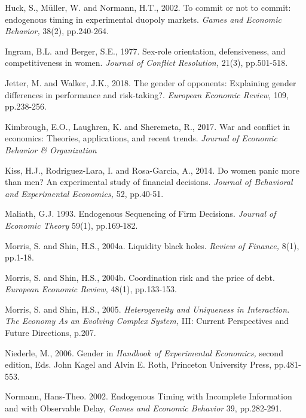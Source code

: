 \documentclass[12pt,english]{article}
\begin{document}
\begin{thebibliography}{10}
\bibitem{}Huck, S., M\"{u}ller, W. and Normann, H.T., 2002. To commit or not to commit: endogenous timing in experimental duopoly markets. \textit{Games and Economic Behavior,} 38(2), pp.240-264.

\bibitem{} Ingram, B.L. and Berger, S.E., 1977. Sex-role orientation, defensiveness, and competitiveness in women. \textit{Journal of Conflict Resolution,} 21(3), pp.501-518.

\bibitem{}Jetter, M. and Walker, J.K., 2018. The gender of opponents: Explaining gender differences in performance and risk-taking?. \textit{European Economic Review,} 109, pp.238-256.


\bibitem{} Kimbrough, E.O., Laughren, K. and Sheremeta, R., 2017. War and conflict in economics: Theories, applications, and recent trends. \textit{Journal of Economic Behavior \& Organization}

\bibitem{} Kiss, H.J., Rodriguez-Lara, I. and Rosa-Garcia, A., 2014. Do women panic more than men? An experimental study of financial decisions. \textit{Journal of Behavioral and Experimental Economics,} 52, pp.40-51.



\bibitem{} Maliath, G.J. 1993. Endogenous Sequencing of Firm Decisions. \textit{Journal of Economic Theory} 59(1), pp.169-182. 

\bibitem{} Morris, S. and Shin, H.S., 2004a. Liquidity black holes. \textit{Review of Finance,} 8(1), pp.1-18.

\bibitem{}  Morris, S. and Shin, H.S., 2004b. Coordination risk and the price of debt. \textit{European Economic Review,} 48(1), pp.133-153.

\bibitem{} Morris, S. and Shin, H.S., 2005. \textit{Heterogeneity and Uniqueness in Interaction. The Economy As an Evolving Complex System,} III: Current Perspectives and Future Directions, p.207.

\bibitem{} Niederle, M., 2006. Gender in \textit{Handbook of Experimental Economics,} second edition, Eds. John Kagel and Alvin E. Roth, Princeton University Press, pp.481-553.

\bibitem{} Normann, Hans-Theo. 2002. Endogenous Timing with Incomplete Information and with Observable Delay, \textit{Games and Economic Behavior} 39, pp.282-291.


\end{thebibliography}
\end{document}
